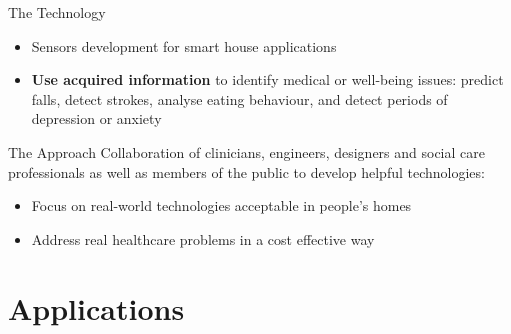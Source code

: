 \documentclass[09pt]{beamer}
\begin{document}
\begin{frame}[allowframebreaks]
\begin{block}{The Technology}
      \begin{itemize}
        \item Sensors development for smart house applications
        \item \textbf{Use acquired information} to identify medical or well-being issues: predict falls, detect strokes, analyse eating behaviour, and detect periods of depression or anxiety
      \end{itemize}
    \end{block}
    \pause
    \begin{block}{The Approach}
      Collaboration of clinicians, engineers, designers and social care professionals as well as members of the public to develop helpful technologies:
      \begin{itemize}
        \item Focus on real-world technologies acceptable in people's homes
        \item Address real healthcare problems in a cost effective way
      \end{itemize}
    \end{block}
  \end{frame}



\section{Applications}
\end{document}
